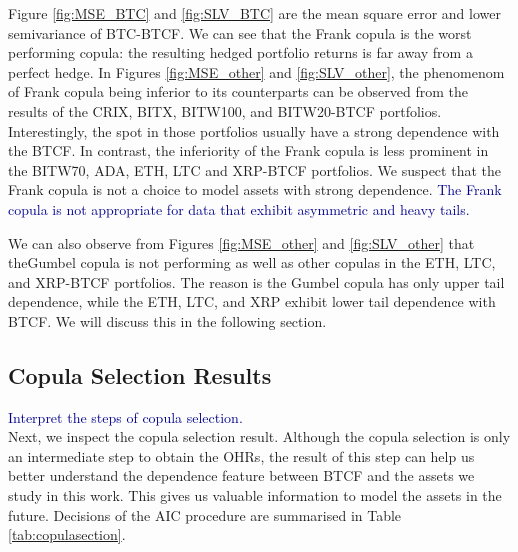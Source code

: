 
Figure \ref{fig:MSE_BTC} and \ref{fig:SLV_BTC}  are the mean square
error and lower semivariance of BTC-BTCF. We can see that the Frank copula
is the worst performing copula: 
the resulting hedged portfolio returns is far away from a perfect
hedge. 
In Figures \ref{fig:MSE_other} and \ref{fig:SLV_other}, the phenomenom
of Frank copula being inferior to its counterparts can be observed
from the results of the CRIX, BITX, BITW100, and BITW20-BTCF
portfolios. 
Interestingly, the spot in those portfolios usually have a strong
dependence with the BTCF. 
In contrast, the inferiority of the Frank copula is less prominent in
the BITW70, ADA, ETH, LTC and XRP-BTCF portfolios. 
We suspect that the Frank copula is not a choice to model assets with
strong dependence. \textcolor{darkblue}{The Frank copula is not
  appropriate for data that exhibit asymmetric and heavy tails.}

We can also observe from Figures \ref{fig:MSE_other} and
\ref{fig:SLV_other} that theGumbel copula is not performing as well as 
other copulas in the ETH, LTC, and XRP-BTCF portfolios. 
The reason is the Gumbel copula has only upper tail dependence,
while the ETH, LTC, and XRP exhibit lower tail dependence with BTCF. 
We will discuss this in the following section. 

\subsection{Copula Selection Results}\label{sec: copula results}
\begin{table}[t]

    \label{tab:copulasection}
\end{table}
\textcolor{darkblue}{Interpret the steps of copula selection.} \\
Next, we inspect the copula selection result.
Although the copula selection is only an intermediate step to obtain the OHRs,
the result of this step can help us better understand the dependence
feature between BTCF and the assets we study in this work.
This gives us valuable information to model the assets in the future.
Decisions of the AIC procedure are summarised in Table \ref{tab:copulasection}.

